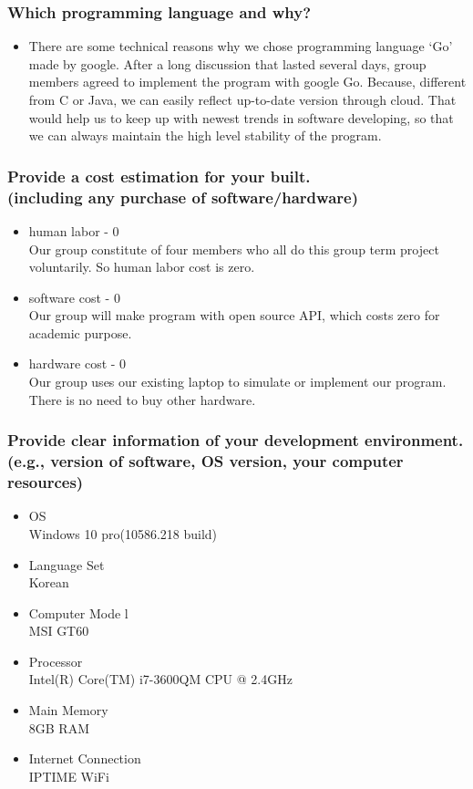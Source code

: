 \documentclass[conference,compsoc, twocolumn]{IEEEtran}
\begin{document}
\subsubsection{Which programming language and why?}
\begin{itemize}
\item There are some technical reasons why we chose programming language ‘Go’ made by google. After a long discussion that lasted several days, group members agreed to implement the program with google Go. Because, different from C or Java, we can easily reflect up-to-date version through cloud. That would help us to keep up with newest trends in software developing, so that we can always maintain the high level stability of the program.
\end{itemize}

\subsubsection{Provide a cost estimation for your built.\\
 (including any purchase of software/hardware)}
\begin{itemize}
\item human labor - 0 \\
Our group constitute of four members who all do this group term project voluntarily. So human labor cost is zero.
\item software cost - 0  \\
Our group will make program with open source API,  which costs zero for academic purpose.
\item hardware cost - 0  \\
Our group uses our existing laptop to simulate or implement our program. There is no need to buy other hardware. 
\end{itemize}

\subsubsection{Provide clear information of your development environment.\\
(e.g., version of software, OS version, your computer resources)}
\begin{itemize}
\item OS \\
Windows 10 pro(10586.218 build)
\item Language Set \\
Korean
\item Computer Mode l\\
MSI GT60
\item Processor \\
Intel(R) Core(TM) i7-3600QM	CPU @ 2.4GHz
\item Main Memory \\
8GB RAM
\item Internet Connection \\
IPTIME WiFi
\end{itemize}
\end{document}
